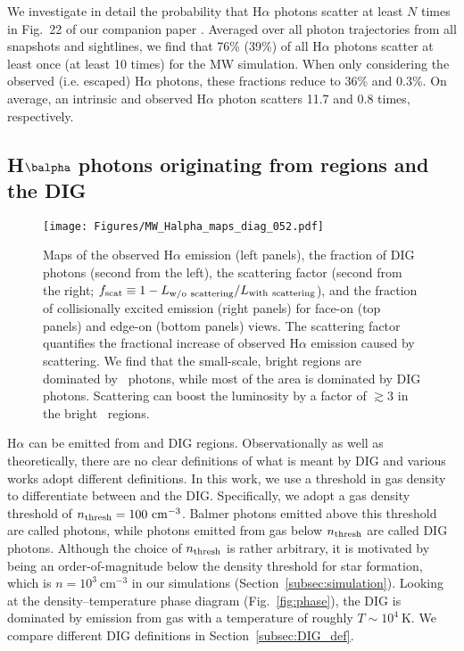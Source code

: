 \documentclass[fleqn,usenatbib]{mnras}
\newcommand\HII{\ion{H}{II}~} %
\begin{document}
We investigate in detail the probability that H$\alpha$ photons scatter at least $N$ times in Fig.~22 of our companion paper \citep{smith21_rt}. Averaged over all photon trajectories from all snapshots and sightlines, we find that 76\% (39\%) of all H$\alpha$ photons scatter at least once (at least 10 times) for the MW simulation. When only considering the observed (i.e. escaped) H$\alpha$ photons, these fractions reduce to 36\% and 0.3\%. On average, an intrinsic and observed H$\alpha$ photon scatters 11.7 and 0.8 times, respectively.


\subsection{H\texorpdfstring{$\balpha$}{α} photons originating from  regions and the DIG}
\label{subsec:HII_DIG}

\begin{figure*}
\begin{center}
\texttt{[image: Figures/MW\_Halpha\_maps\_diag\_052.pdf]}
\caption{Maps of the observed H$\alpha$ emission (left panels), the fraction of DIG photons (second from the left), the scattering factor (second from the right; $f_{\rm scat} \equiv 1 - L_{\rm w/o~scattering} / L_{\rm with~scattering}$), and the fraction of collisionally excited emission (right panels) for face-on (top panels) and edge-on (bottom panels) views. The scattering factor quantifies the fractional increase of observed H$\alpha$ emission caused by scattering. We find that the small-scale, bright regions are dominated by \HII photons, while most of the area is dominated by DIG photons. Scattering can boost the luminosity by a factor of $\gtrsim3$ in the bright \HII regions.}
\label{fig:Halpha_fraction}
\end{center}
\end{figure*}

H$\alpha$ can be emitted from  and DIG regions. Observationally as well as theoretically, there are no clear definitions of what is meant by DIG and various works adopt different definitions. In this work, we use a threshold in gas density to differentiate between  and the DIG. Specifically, we adopt a gas density threshold of $n_{\rm thresh}=100~\mathrm{cm}^{-3}$. Balmer photons emitted above this threshold are called  photons, while photons emitted from gas below $n_{\rm thresh}$ are called DIG photons. Although the choice of $n_{\rm thresh}$ is rather arbitrary, it is motivated by being an order-of-magnitude below the density threshold for star formation, which is $n=10^3~\mathrm{cm}^{-3}$ in our simulations (Section~\ref{subsec:simulation}). Looking at the density--temperature phase diagram (Fig.~\ref{fig:phase}), the DIG is dominated by emission from gas with a temperature of roughly $T\sim10^4~\mathrm{K}$. We compare different DIG definitions in Section~\ref{subsec:DIG_def}.
\end{document}
